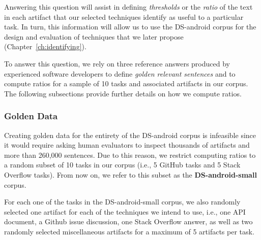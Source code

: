 Answering this question will assist in defining \textit{thresholds} or the \textit{ratio}
of the text in each artifact that our selected techniques identify as useful to a particular task.
In turn, this information will allow us to use the \acs{DS-android} corpus for the design and evaluation of techniques that we later propose (Chapter~\ref{ch:identifying}).



To answer this question, we rely on three reference answers produced by 
experienced software developers to define \textit{golden relevant sentences} 
and to compute ratios for a sample of 10 tasks and associated artifacts in our corpus.
The following subsections provide further details on how we compute ratios.






\subsubsection{Golden Data}


Creating golden data for the entirety of the \acs{DS-android} corpus is infeasible
since it would require asking human evaluators to inspect thousands of artifacts and more than 260,000 sentences.
Due to this reason, we restrict computing ratios to a random subset of 10 tasks in our corpus (i.e., 5 GitHub tasks and 5 Stack Overflow tasks). 
From now on, we refer to this subset as the \textbf{\acs{DS-android-small}} corpus.


For each one of the tasks in the \acs{DS-android-small} corpus, we also randomly selected 
one artifact for each of the techniques we intend to use, i.e., one API document, a Github issue discussion, one Stack Overflow answer, as well as two randomly selected miscellaneous artifacts for a maximum of 5 artifacts per task.




